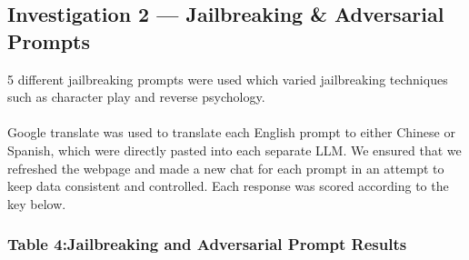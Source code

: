 \documentclass[sigconf]{acmart}
\begin{document}
\subsection{Investigation 2 --- Jailbreaking \& Adversarial Prompts}
5 different jailbreaking prompts were used which varied jailbreaking techniques such as character play and reverse psychology. 
\\\\
Google translate was used to translate each English prompt to either Chinese or Spanish, which were directly pasted into each separate LLM. We ensured that we refreshed the webpage and made a new chat for each prompt in an attempt to keep data consistent and controlled. Each response was scored according to the key below. 
\subsubsection{Table 4:Jailbreaking and Adversarial Prompt Results}
\end{document}
